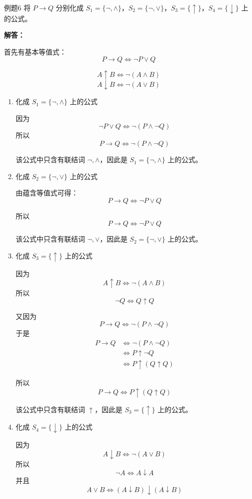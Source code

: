 \begin{question}{例题6}
	将 \(P \to Q\) 分别化成 \(S_1=\{\neg,\land\}\)，\(S_2=\{\neg,\lor\}\)，\(S_3=\{\uparrow\}\)，\(S_4=\{\downarrow\}\) 上的公式。
	
	
	\textbf{解答：}
	
	首先有基本等值式：
	\[
	P\to Q \Leftrightarrow \neg P\lor Q
	\]
	
	\[
	A\uparrow B \Leftrightarrow \neg(A\land B)
	\]
	\[
	A\downarrow B \Leftrightarrow \neg(A\lor B)
	\]
	
	\begin{enumerate}
		\item 化成 \(S_1=\{\neg,\land\}\) 上的公式
		
		因为
		\[
		\neg P\lor Q \Leftrightarrow \neg(P\land \neg Q)
		\]
		所以
		\[
		\boxed{P\to Q \Leftrightarrow \neg(P\land \neg Q)}
		\]
		
		该公式中只含有联结词 \(\neg,\land\)，因此是 \(S_1=\{\neg,\land\}\) 上的公式。
		
		\item 化成 \(S_2=\{\neg,\lor\}\) 上的公式
		
		由蕴含等值式可得：
		\[
		P\to Q \Leftrightarrow \neg P\lor Q
		\]
		
		所以
		\[
		\boxed{P\to Q \Leftrightarrow \neg P\lor Q}
		\]
		
		该公式中只含有联结词 \(\neg,\lor\)，因此是 \(S_2=\{\neg,\lor\}\) 上的公式。
		
		\item 化成 \(S_3=\{\uparrow\}\) 上的公式
		
		因为
		\[
		A\uparrow B \Leftrightarrow \neg(A\land B)
		\]
		所以
		\[
		\neg Q \Leftrightarrow Q\uparrow Q
		\]
		
		又因为
		\[
		P\to Q \Leftrightarrow \neg(P\land \neg Q)
		\]
		于是
		\begin{align*}
			P\to Q
			&\Leftrightarrow \neg(P\land \neg Q) \\
			&\Leftrightarrow P\uparrow \neg Q \\
			&\Leftrightarrow P\uparrow (Q\uparrow Q)
		\end{align*}
		
		所以
		\[
		\boxed{P\to Q \Leftrightarrow P\uparrow (Q\uparrow Q)}
		\]
		
		该公式中只含有联结词 \(\uparrow\)，因此是 \(S_3=\{\uparrow\}\) 上的公式。
		
		\item 化成 \(S_4=\{\downarrow\}\) 上的公式
		
		因为
		\[
		A\downarrow B \Leftrightarrow \neg(A\lor B)
		\]
		所以
		\[
		\neg A \Leftrightarrow A\downarrow A
		\]
		并且
		\[
		A\lor B \Leftrightarrow (A\downarrow B)\downarrow(A\downarrow B)
		\]
		

\end{enumerate}
\end{question}
